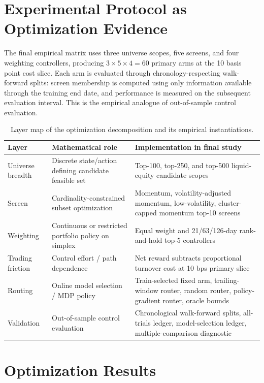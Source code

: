 \documentclass[journal,10pt]{IEEEtran}
\begin{document}
\section{Experimental Protocol as Optimization Evidence}
The final empirical matrix uses three universe scopes, five screens, and four weighting controllers, producing $3\times5\times4=60$ primary arms at the 10 basis point cost slice. Each arm is evaluated through chronology-respecting walk-forward splits: screen membership is computed using only information available through the training end date, and performance is measured on the subsequent evaluation interval. This is the empirical analogue of out-of-sample control evaluation.

\begin{table}[!t]
\centering
\caption{Layer map of the optimization decomposition and its empirical instantiations.}
\label{tab:layer_map}
\small
\begin{tabularx}{\textwidth}{p{2.6cm}p{3.8cm}X}
\toprule
Layer & Mathematical role & Implementation in final study\\
\midrule
Universe breadth & Discrete state/action defining candidate feasible set & Top-100, top-250, and top-500 liquid-equity candidate scopes\\
Screen & Cardinality-constrained subset optimization & Momentum, volatility-adjusted momentum, low-volatility, cluster-capped momentum top-10 screens\\
Weighting & Continuous or restricted portfolio policy on simplex & Equal weight and 21/63/126-day rank-and-hold top-5 controllers\\
Trading friction & Control effort / path dependence & Net reward subtracts proportional turnover cost at 10 bps primary slice\\
Routing & Online model selection / MDP policy & Train-selected fixed arm, trailing-window router, random router, policy-gradient router, oracle bounds\\
Validation & Out-of-sample control evaluation & Chronological walk-forward splits, all-trials ledger, model-selection ledger, multiple-comparison diagnostic\\
\bottomrule
\end{tabularx}
\end{table}

\section{Optimization Results}
\end{document}
